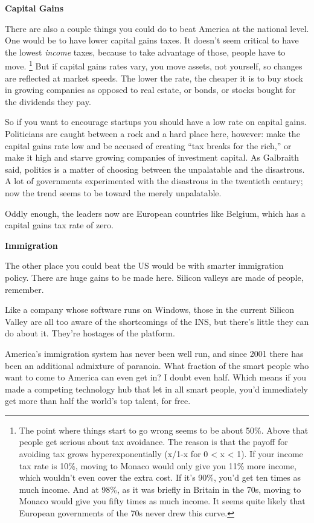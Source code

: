 \documentclass[12pt]{book}
\begin{document}
\textbf{Capital Gains}

There are also a couple things you could do to beat America at the
national level. One would be to have lower capital gains taxes. It
doesn't seem critical to have the lowest \emph{income} taxes, because to
take advantage of those, people have to move. \footnote{The point where things start to go wrong seems to be about 50\%.
Above that people get serious about tax avoidance. The reason is that
the payoff for avoiding tax grows hyperexponentially (x/1-x for 0
\textless{} x \textless{} 1). If your income tax rate is 10\%, moving to
Monaco would only give you 11\% more income, which wouldn't even cover
the extra cost. If it's 90\%, you'd get ten times as much income. And at
98\%, as it was briefly in Britain in the 70s, moving to Monaco would
give you fifty times as much income. It seems quite likely that European
governments of the 70s never drew this curve.}
But if capital gains rates vary, you move assets, not yourself, so
changes are reflected at market speeds. The lower the rate, the cheaper
it is to buy stock in growing companies as opposed to real estate, or
bonds, or stocks bought for the dividends they pay.

So if you want to encourage startups you should have a low rate on
capital gains. Politicians are caught between a rock and a hard place
here, however: make the capital gains rate low and be accused of
creating ``tax breaks for the rich,'' or make it high and starve growing
companies of investment capital. As Galbraith said, politics is a matter
of choosing between the unpalatable and the disastrous. A lot of
governments experimented with the disastrous in the twentieth century;
now the trend seems to be toward the merely unpalatable.

Oddly enough, the leaders now are European countries like Belgium, which
has a capital gains tax rate of zero.

\textbf{Immigration}

The other place you could beat the US would be with smarter immigration
policy. There are huge gains to be made here. Silicon valleys are made
of people, remember.

Like a company whose software runs on Windows, those in the current
Silicon Valley are all too aware of the shortcomings of the INS, but
there's little they can do about it. They're hostages of the platform.

America's immigration system has never been well run, and since 2001
there has been an additional admixture of paranoia. What fraction of the
smart people who want to come to America can even get in? I doubt even
half. Which means if you made a competing technology hub that let in all
smart people, you'd immediately get more than half the world's top
talent, for free.
\end{document}
